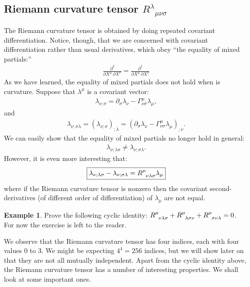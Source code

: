\documentclass{article}
\theoremstyle{definition}
\newtheorem{exmp}{Example}[section]
\begin{document}
\subsection{Riemann curvature tensor $R^{\lambda}_{\text{ }\mu\nu\sigma}$}
The Riemann curvature tensor is obtained by doing repeated covariant differentiation. Notice, though, that we are concerned with covariant differentiation rather than usual derivatives, which obey ``the equality of mixed partials:''
\begin{align*}
\frac{\partial^2}{\partial X^\mu\,\partial X^\nu} = \frac{\partial^2}{\partial X^\mu\, \partial X^\nu}
\end{align*}
As we have learned, the equality of mixed partials does not hold when is curvature. Suppose that $\lambda^\mu$ is a covariant vector:
\begin{align*}
\lambda_{\nu;\sigma} = \partial_\sigma \lambda_\nu - \Gamma^\mu_{\nu\sigma}\lambda_\mu,
\end{align*}
and 
\begin{align*}
\lambda_{\nu;\sigma\lambda} = \left(\lambda_{\nu;\sigma} \right)_{;\lambda} = \left(\partial_\sigma \lambda_\nu - \Gamma^\mu_{\nu\sigma}\lambda_\mu  \right)_{;\nu}.
\end{align*}
We can easily show that the equality of mixed partials no longer hold in general:
\begin{align*}
\lambda_{\nu;\lambda\sigma} \neq \lambda_{\nu;\sigma\lambda}.
\end{align*}
However, it is even more interesting that:
\begin{align*}
\boxed{\lambda_{\nu;\lambda\sigma} - \lambda_{\nu;\sigma\lambda} = \tensor{R}{^{\mu}_{\nu\lambda\sigma}}\lambda_\mu}
\end{align*}
where if the Riemann curvature tensor is nonzero then the covariant second-derivatives (of different order of differentiation) of $\lambda_\mu$ are not equal. \\

\begin{exmp}
	Prove the following cyclic identity:	$\tensor{R}{^{\mu}_{\nu\lambda\sigma}} + \tensor{R}{^{\mu}_{\lambda\sigma\nu}} + \tensor{R}{^{\mu}_{\sigma\nu\lambda}} = 0$.\\
	
	For now the exercise is left to the reader. 
\end{exmp}
We observe that the Riemann curvature tensor has four indices, each with four values 0 to 3. We might be expecting $4^4 = 256$ indices, but we will show later on that they are not all mutually independent. Apart from the cyclic identity above, the Riemann curvature tensor has a number of interesting properties. We shall look at some important ones.\\
\end{document}
